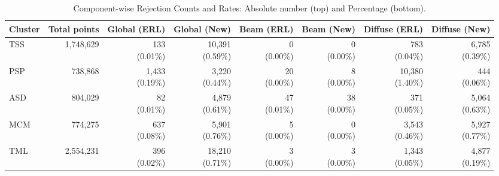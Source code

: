\begin{table}[htbp]
\centering
\caption{Component-wise Rejection Counts and Rates: Absolute number (top) and Percentage (bottom).} 
\label{tab:component_rejection_rates}
\begin{tabular}{lrrrrrrr}
  \toprule
Cluster & Total points & Global (ERL) & Global (New) & Beam (ERL) & Beam (New) & Diffuse (ERL) & Diffuse (New) \\ 
  \midrule
TSS & 1,748,629 & \makecell{  133 \\ (0.01\%)} & \makecell{10,391 \\ (0.59\%)} & \makecell{ 0 \\ (0.00\%)} & \makecell{ 0 \\ (0.00\%)} & \makecell{   783 \\ (0.04\%)} & \makecell{6,785 \\ (0.39\%)} \\ 
  PSP &   738,868 & \makecell{1,433 \\ (0.19\%)} & \makecell{ 3,220 \\ (0.44\%)} & \makecell{20 \\ (0.00\%)} & \makecell{ 8 \\ (0.00\%)} & \makecell{10,380 \\ (1.40\%)} & \makecell{  444 \\ (0.06\%)} \\ 
  ASD &   804,029 & \makecell{   82 \\ (0.01\%)} & \makecell{ 4,879 \\ (0.61\%)} & \makecell{47 \\ (0.01\%)} & \makecell{38 \\ (0.00\%)} & \makecell{   371 \\ (0.05\%)} & \makecell{5,064 \\ (0.63\%)} \\ 
  MCM &   774,275 & \makecell{  637 \\ (0.08\%)} & \makecell{ 5,901 \\ (0.76\%)} & \makecell{ 5 \\ (0.00\%)} & \makecell{ 0 \\ (0.00\%)} & \makecell{ 3,543 \\ (0.46\%)} & \makecell{5,927 \\ (0.77\%)} \\ 
  TML & 2,554,231 & \makecell{  396 \\ (0.02\%)} & \makecell{18,210 \\ (0.71\%)} & \makecell{ 3 \\ (0.00\%)} & \makecell{ 3 \\ (0.00\%)} & \makecell{ 1,343 \\ (0.05\%)} & \makecell{4,877 \\ (0.19\%)} \\ 

\end{tabular}
\end{table}
